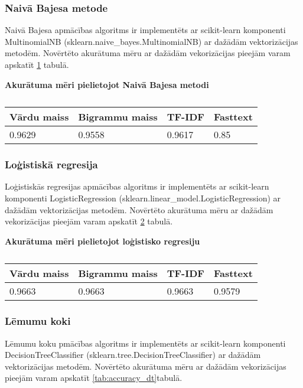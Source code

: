 \subsubsection{Naivā Bajesa metode}
Naivā Bajesa apmācības algoritms ir implementēts ar scikit-learn komponenti MultinomialNB (sklearn.naive\_bayes.MultinomialNB) ar dažādām vektorizācijas metodēm. Novērtēto akurātuma mēru ar dažādām vekorizācijas pieejām varam apskatīt \ref{tab:accuracy_nb} tabulā.
\begin{table}[H]
\centering
\caption{\label{tab:accuracy_nb}}
\textbf{Akurātuma mēri pielietojot Naivā Bajesa metodi\\}
\begin{tabular}{|l|l|l|l|}
\hline
Vārdu maiss & Bigrammu maiss & TF-IDF & Fasttext \\ \hline
0.9629 & 0.9558 & 0.9617 & 0.85 \\ \hline
\end{tabular}
\end{table}

\subsubsection{Loģistiskā regresija}
Loģistiskās regresijas apmācības algoritms ir implementēts ar scikit-learn komponenti LogisticRegression (sklearn.linear\_model.LogisticRegression) ar dažādām vektorizācijas metodēm. Novērtēto akurātuma mēru ar dažādām vekorizācijas pieejām varam apskatīt \ref{tab:accuracy_lr} tabulā.

\begin{table}[H]
\centering
\caption{\label{tab:accuracy_lr}}
\textbf{Akurātuma mēri pielietojot loģistisko regresiju\\}
\begin{tabular}{|l|l|l|l|}
\hline
Vārdu maiss & Bigrammu maiss & TF-IDF & Fasttext \\ \hline
0.9663 & 0.9663 & 0.9663 & 0.9579 \\ \hline
\end{tabular}
\end{table}

\subsubsection{Lēmumu koki}
Lēmumu koku pmācības algoritms ir implementēts ar scikit-learn komponenti DecisionTreeClassifier (sklearn.tree.DecisionTreeClassifier) ar dažādām vektorizācijas metodēm. Novērtēto akurātuma mēru ar dažādām vekorizācijas pieejām varam apskatīt \ref{tab:accuracy_dt}tabulā.

